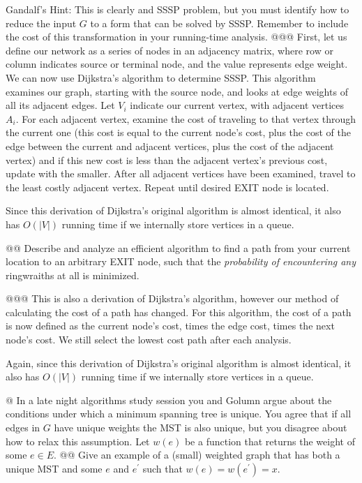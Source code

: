 \documentclass[10pt]{article}\usepackage[]{graphicx}\usepackage[]{xcolor}
\begin{document}
\begin{easylist}[enumerate]
    Gandalf's Hint: This is clearly and SSSP problem, but you must identify how to reduce the input $G$ to a form that
    can be solved by SSSP. Remember to include the cost of this transformation in your running-time analysis.
    @@@ First, let us define our network as a series of nodes in an adjacency matrix, where row or column indicates
    source or terminal node, and the value represents edge weight. We can now use Dijkstra's algorithm to determine
    SSSP. This algorithm examines our graph, starting with the source node, and looks at edge weights of all its
    adjacent edges. Let $V_i$ indicate our current vertex, with adjacent vertices $A_i$. For each adjacent vertex,
    examine the cost of traveling to that vertex through the current one (this cost is equal to the current node's cost,
    plus the cost of the edge between the current and adjacent vertices, plus the cost of the adjacent vertex) and if
    this new cost is less than the adjacent vertex's previous cost, update with the smaller. After all adjacent vertices
    have been examined, travel to the least costly adjacent vertex. Repeat until desired EXIT node is located.\newline

    Since this derivation of Dijkstra's original algorithm is almost identical, it also has $O(|V|)$ running time if we
    internally store vertices in a queue.

    @@ Describe and analyze an efficient algorithm to find a path from your current location to an arbitrary EXIT node,
    such that the \textit{probability of encountering any} ringwraiths at all is minimized.

    @@@ This is also a derivation of Dijkstra's algorithm, however our method of calculating the cost of a path has
    changed. For this algorithm, the cost of a path is now defined as the current node's cost, times the edge cost,
    times the next node's cost. We still select the lowest cost path after each analysis.\newline

    Again, since this derivation of Dijkstra's original algorithm is almost identical, it also has $O(|V|)$ running time
    if we internally store vertices in a queue.

    @ In a late night algorithms study session you and Golumn argue about the conditions under which a minimum spanning
    tree is unique. You agree that if all edges in $G$ have unique weights the MST is also unique, but you disagree
    about how to relax this assumption. Let $w(e)$ be a function that returns the weight of some $e \in E$.
    @@ Give an example of a (small) weighted graph that has both a unique MST and some $e$ and $e^\prime$ such that
    $w(e) = w(e^\prime) = x$.


\end{easylist}
\end{document}
